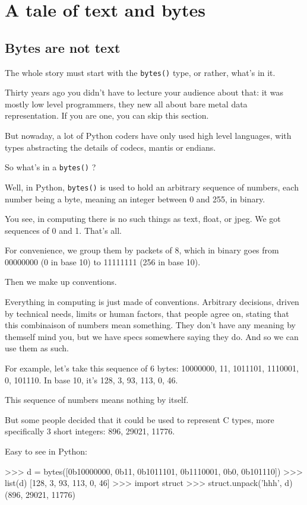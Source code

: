 \section{A tale of text and bytes}

\subsection{Bytes are not text}

The whole story must start with the \lstinline{bytes()} type, or rather, what's in it.

Thirty years ago you didn't have to lecture your audience about that: it was mostly low level programmers, they new all about bare metal data representation. If you are one, you can skip this section.

But nowaday, a lot of Python coders have only used high level languages, with types abstracting the details of codecs, mantis or endians.

So what's in a \lstinline{bytes()} ?

Well, in Python, \lstinline{bytes()} is used to hold an arbitrary sequence of numbers, each number being a byte, meaning an integer between 0 and 255, in binary.

You see, in computing there is no such things as text, float, or jpeg. We got sequences of 0 and 1. That's all.

For convenience, we group them by packets of 8, which in binary goes from 00000000 (0 in base 10) to 11111111 (256 in base 10).

Then we make up conventions.

Everything in computing is just made of conventions. Arbitrary decisions, driven by technical needs, limits or human factors, that people agree on, stating that this combinaison of numbers mean something. They don't have any meaning by themself mind you, but we have specs somewhere saying they do. And so we can use them as such.

For example, let's take this sequence of 6 bytes: 10000000, 11, 1011101, 1110001, 0, 101110. In base 10, it's 128, 3, 93, 113, 0, 46.

This sequence of numbers means nothing by itself.

But some people decided that it could be used to represent C types, more specifically 3 short integers: 896, 29021, 11776.

Easy to see in Python:

\begin{py2and3}
>>> d = bytes([0b10000000, 0b11, 0b1011101, 0b1110001, 0b0, 0b101110])
>>> list(d)
[128, 3, 93, 113, 0, 46]
>>> import struct
>>> struct.unpack('hhh', d)
(896, 29021, 11776)
\end{py2and3}

